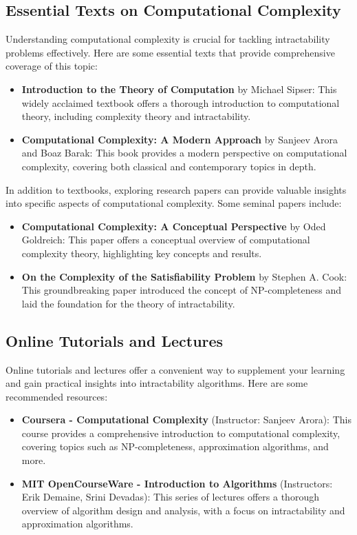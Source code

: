 \subsection{Essential Texts on Computational Complexity}
Understanding computational complexity is crucial for tackling intractability problems effectively. Here are some essential texts that provide comprehensive coverage of this topic:

\begin{itemize}
    \item \textbf{Introduction to the Theory of Computation} by Michael Sipser: This widely acclaimed textbook offers a thorough introduction to computational theory, including complexity theory and intractability.
    \item \textbf{Computational Complexity: A Modern Approach} by Sanjeev Arora and Boaz Barak: This book provides a modern perspective on computational complexity, covering both classical and contemporary topics in depth.
\end{itemize}

In addition to textbooks, exploring research papers can provide valuable insights into specific aspects of computational complexity. Some seminal papers include:

\begin{itemize}
    \item \textbf{Computational Complexity: A Conceptual Perspective} by Oded Goldreich: This paper offers a conceptual overview of computational complexity theory, highlighting key concepts and results.
    \item \textbf{On the Complexity of the Satisfiability Problem} by Stephen A. Cook: This groundbreaking paper introduced the concept of NP-completeness and laid the foundation for the theory of intractability.
\end{itemize}

\subsection{Online Tutorials and Lectures}
Online tutorials and lectures offer a convenient way to supplement your learning and gain practical insights into intractability algorithms. Here are some recommended resources:

\begin{itemize}
    \item \textbf{Coursera - Computational Complexity} (Instructor: Sanjeev Arora): This course provides a comprehensive introduction to computational complexity, covering topics such as NP-completeness, approximation algorithms, and more.
    \item \textbf{MIT OpenCourseWare - Introduction to Algorithms} (Instructors: Erik Demaine, Srini Devadas): This series of lectures offers a thorough overview of algorithm design and analysis, with a focus on intractability and approximation algorithms.
\end{itemize}

